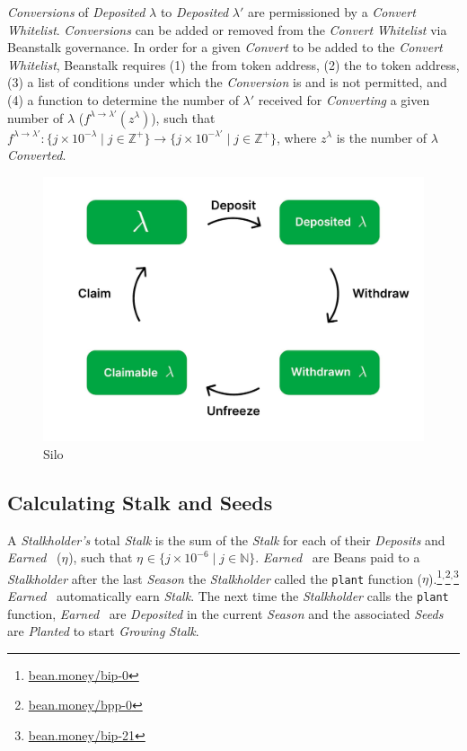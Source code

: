 \documentclass[tikz]{article}
\newcommand{\code}[1]{\texttt{#1}}
\newcommand{\term}[1]{\textsl{#1}}
\newcommand{\Bean}{} %
\newcommand{\bean}{} %
\begin{document}
\term{Conversions} of \term{Deposited} $\lambda$ to \term{Deposited} $\lambda'$ are permissioned by a \term{Convert} \term{Whitelist}. \term{Conversions} can be added or removed from the \term{Convert} \term{Whitelist} via Beanstalk governance. In order for a given \term{Convert} to be added to the \term{Convert} \term{Whitelist}, Beanstalk requires (1) the from token address, (2) the to token address, (3) a list of conditions under which the \term{Conversion} is and is not permitted, and (4) a function to determine the number of $\lambda'$ received for \term{Converting} a given number of $\lambda$ ($f^{\lambda \rightarrow \lambda'}(z^{\lambda})$), such that $f^{\lambda \rightarrow \lambda'}\colon \{j \times 10^{-\lambda} \mid j \in \mathbb{Z}^{+} \} \rightarrow \{j \times 10^{-\lambda'} \mid j \in \mathbb{Z}^{+} \}$, where $z^{\lambda}$ is the number of $\lambda$ \term{Converted}. 

\begin{figure}[h!]
    \centering
    \includegraphics[scale=.16]{Figure1}
    \vspace*{-5mm}
    \caption{Silo}
    \label{fig 1}
\end{figure}

\subsection{Calculating Stalk and Seeds}
A \term{Stalkholder's} total \term{Stalk} is the sum of the \term{Stalk} for each of their \term{Deposits} and \term{Earned} \Bean\ ($\eta^{\bean}$), such that $\eta^{\bean} \in \{j \times 10^{-6} \mid j \in \mathbb{N} \}$. 
\term{Earned} \Bean\ are Beans paid to a \term{Stalkholder} after the last \term{Season} the \term{Stalkholder} called the \code{plant} function ($\eta$).\footnote{\href{https://bean.money/bip-0}{bean.money/bip-0}}$^{,}$\footnote{\href{https://bean.money/bpp-0}{bean.money/bpp-0}}$^{,}$\footnote{\href{https://bean.money/bip-21}{bean.money/bip-21}} \term{Earned} \Bean\ automatically earn \term{Stalk}. The next time the \term{Stalkholder} calls the \code{plant} function, \term{Earned} \Bean\ are \term{Deposited} in the current \term{Season} and the associated \term{Seeds} are \term{Planted} to start \term{Growing} \term{Stalk}.
\end{document}
